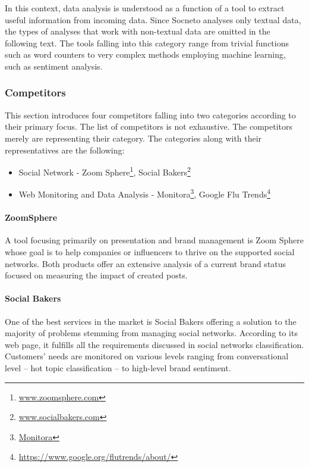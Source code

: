 In this context, data analysis is understood as a function of a tool to extract useful information from incoming data. Since Socneto analyses only textual data, the types of analyses that work with non-textual data are omitted in the following text. The tools falling into this category range from trivial functions such as word counters to very complex methods employing machine learning, such as sentiment analysis.

\subsubsection{Competitors}

This section introduces four competitors falling into two categories according to their primary focus. The list of competitors is not exhaustive. The competitors merely are representing their category. The categories along with their representatives are the following:

\begin{itemize}
    \item Social Network - Zoom Sphere\footnote{\url{www.zoomsphere.com}}, Social Bakers\footnote{\url{www.socialbakers.com}}
    \item Web Monitoring and Data Analysis - Monitora\footnote{\url{Monitora}}, Google Flu Trends\footnote{\url{https://www.google.org/flutrends/about/}}
\end{itemize}



\paragraph{ZoomSphere}
A tool focusing primarily on presentation and brand management is Zoom Sphere whose goal is to help companies or influencers to thrive on the supported social networks. Both products offer an extensive analysis of a current brand status focused on measuring the impact of created posts.

\paragraph{Social Bakers}

One of the best services in the market is Social Bakers offering a solution to the majority of problems stemming from managing social networks. According to its web page, it fulfills all the requirements discussed in social networks classification. Customers' needs are monitored on various levels ranging from conversational level -- hot topic classification -- to high-level brand sentiment. 

